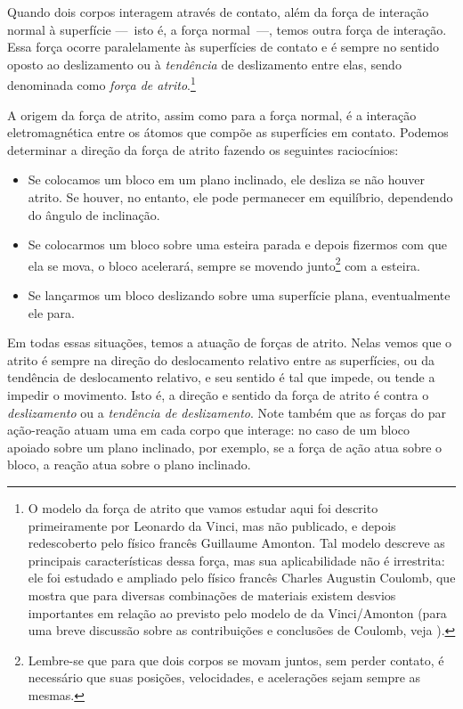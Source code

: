 Quando dois corpos interagem através de contato, além da força de interação normal à superfície ---~isto é, a força normal~---, temos outra força de interação. Essa força ocorre paralelamente às superfícies de contato e é sempre no sentido oposto ao deslizamento ou à \emph{tendência} de deslizamento entre elas, sendo denominada como \emph{força de atrito}.\footnote[][-3cm]{O modelo da força de atrito que vamos estudar aqui foi descrito primeiramente por Leonardo da Vinci, mas não publicado, e depois redescoberto pelo físico francês Guillaume Amonton. Tal modelo descreve as principais características dessa força, mas sua aplicabilidade não é irrestrita: ele foi estudado e ampliado pelo físico francês Charles Augustin Coulomb, que mostra que para diversas combinações de materiais existem desvios importantes em relação ao previsto pelo modelo de da Vinci/Amonton (para uma breve discussão sobre as contribuições e conclusões de Coulomb, veja ).}

A origem da força de atrito, assim como para a força normal, é a interação eletromagnética entre os átomos que compõe as superfícies em contato. Podemos determinar a direção da força de atrito fazendo os seguintes raciocínios:
\begin{itemize}
    \item Se colocamos um bloco em um plano inclinado, ele desliza se não houver atrito. Se houver, no entanto, ele pode permanecer em equilíbrio, dependendo do ângulo de inclinação.
    \item Se colocarmos um bloco sobre uma esteira parada e depois fizermos com que ela se mova, o bloco acelerará, sempre se movendo junto\footnote{Lembre-se que para que dois corpos se movam juntos, sem perder contato, é necessário que suas posições, velocidades, e acelerações sejam sempre as mesmas.} com a esteira.
    \item Se lançarmos um bloco deslizando sobre uma superfície plana, eventualmente ele para.
\end{itemize}
%
Em todas essas situações, temos a atuação de forças de atrito. Nelas vemos que o atrito é sempre na direção do deslocamento relativo entre as superfícies, ou da tendência de deslocamento relativo, e seu sentido é tal que impede, ou tende a impedir o movimento. Isto é, a direção e sentido da força de atrito é contra o \emph{deslizamento} ou a \emph{tendência de deslizamento}. Note também que as forças do par ação-reação atuam uma em cada corpo que interage: no caso de um bloco apoiado sobre um plano inclinado, por exemplo, se a força de ação atua sobre o bloco, a reação atua sobre o plano inclinado.

